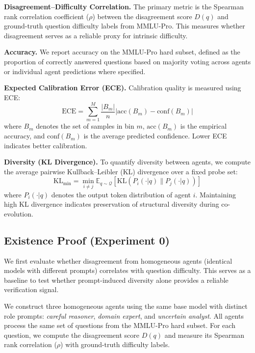 \documentclass{article}
\begin{document}
\textbf{Disagreement–Difficulty Correlation.} The primary metric is the Spearman rank correlation coefficient ($\rho$) between the disagreement score $D(q)$ and ground-truth question difficulty labels from MMLU-Pro. This measures whether disagreement serves as a reliable proxy for intrinsic difficulty.

\textbf{Accuracy.} We report accuracy on the MMLU-Pro hard subset, defined as the proportion of correctly answered questions based on majority voting across agents or individual agent predictions where specified.

\textbf{Expected Calibration Error (ECE).} Calibration quality is measured using ECE:
\begin{equation}
\mathrm{ECE} = \sum_{m=1}^{M} \frac{|B_m|}{n} \left| \mathrm{acc}(B_m) - \mathrm{conf}(B_m) \right|
\end{equation}
where $B_m$ denotes the set of samples in bin $m$, $\mathrm{acc}(B_m)$ is the empirical accuracy, and $\mathrm{conf}(B_m)$ is the average predicted confidence. Lower ECE indicates better calibration.

\textbf{Diversity (KL Divergence).} To quantify diversity between agents, we compute the average pairwise Kullback–Leibler (KL) divergence over a fixed probe set:
\begin{equation}
\mathrm{KL}_{\text{min}} = \min_{i \neq j} \mathbb{E}_{q \sim \mathcal{Q}} \left[ \mathrm{KL}(P_i(\cdot|q) \parallel P_j(\cdot|q)) \right]
\end{equation}
where $P_i(\cdot|q)$ denotes the output token distribution of agent $i$. Maintaining high KL divergence indicates preservation of structural diversity during co-evolution.

\subsection{Existence Proof (Experiment 0)}

We first evaluate whether disagreement from homogeneous agents (identical models with different prompts) correlates with question difficulty. This serves as a baseline to test whether prompt-induced diversity alone provides a reliable verification signal.

We construct three homogeneous agents using the same base model with distinct role prompts: \textit{careful reasoner}, \textit{domain expert}, and \textit{uncertain analyst}. All agents process the same set of questions from the MMLU-Pro hard subset. For each question, we compute the disagreement score $D(q)$ and measure its Spearman rank correlation ($\rho$) with ground-truth difficulty labels.
\end{document}
